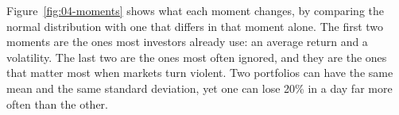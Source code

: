 Figure~\ref{fig:04-moments} shows what each moment changes, by comparing the normal distribution with one that differs in that moment alone. The first two moments are the ones most investors already use: an average return and a volatility. The last two are the ones most often ignored, and they are the ones that matter most when markets turn violent. Two portfolios can have the same mean and the same standard deviation, yet one can lose 20\% in a day far more often than the other.


